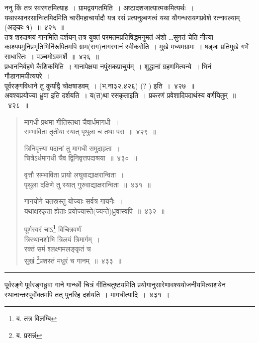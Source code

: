 \documentclass[11pt, openany]{book}
\begin{document}
ननु किं तत्र स्वरगतमित्याह~। {\qtt ग्रामद्वयगतमिति}~। अष्टादशजात्यात्मकमित्यर्थः~। यथास्थानरसान्वितमिदमिति चारीमहाचार्यादौ यत्र रसं प्रत्यनुल्बणत्वं यथा यौगन्धरायणप्रवेशे रत्नावल्याम् (अङ्कः १)~॥~४२५~॥\\

तत्र शरदाश्रयं गानमिति दर्शयन् तत्र युक्तं परमतमप्रतिषिद्धमनुमतं अंशो \ldots सुगतं चेति नीत्या काश्यपमुनिप्रभृतिभिर्निरूपितमपि ग्राम(राग)नागरगानं स्वीकरोति~। मुखे मध्यमग्रामः~। षड्जः {\qtt प्रतिमुखे} गर्भे साधारितः~। पञ्चमोऽवमर्शे~॥~४२६~॥\\

{\qtt प्रधाननिर्वहणे कैशिक}मिति~। {\qtt गानापेक्षया नपुंसकप्राचुर्यम्}~। शुद्धानां ग्रहणमित्यन्ये~। भिनं {\qtt गौडानामपीत्यपरे}~।\\

पूर्वरङ्गविधाने तु {\qtt कुर्याद्वै चोक्षषाडवम्}~। (भ.ना३२.४२६) (? ) इति~।~४२७~॥\\

{\qtt अवश्यप्रयोज्या} ध्रुवा इति दर्शयति~। य(त)था रसकृताइति~। प्रकरणं प्रवेशादिपदार्थस्य वर्णयितुम्~॥~४२८~॥

\newpage

\begin{quote}
{\na मागधी प्रथमा गीतिस्तथा चैवार्धमागधी~।\\
 सम्भाविता तृतीया स्यात् पृथुला च तथा परा~॥~४२९~॥

 त्रिनिवृत्त्या पदानां तु मागधी समुदाहृता~।\\
 चित्रेऽर्धमागधी चैव द्विनिवृत्तपदाश्रया~॥~४३०~॥

 वृत्तौ सम्भाविता प्रायो लघुवाद्याक्षरान्विता~।\\
 पृथुला दक्षिणे तु स्यात् गुरुवाद्याक्षरान्विता~॥~४३१~॥

 गानयोगे चतस्रस्तु योज्याः सर्वत्र गायनैः~।\\
 यथाक्षरकृता ह्येताः प्रयोज्यास्ते(ज्यन्ते)ध्रुवास्वपि~॥~४३२~॥

 पूर्णस्वरं चाऽ\renewcommand{\thefootnote}{1}\footnote{ब. तत्र विलम्बि} विचित्रवर्णं\\
 त्रिस्थानशोभि त्रिलयं त्रिमार्गम्~।\\
 रक्तं समं श्लक्ष्णमलङ्कृतं च\\
 सुखं \renewcommand{\thefootnote}{2}\footnote{ब. प्रसन्नं}प्रशस्तं मधुरं च गानम्~॥~४३३~॥}
\end{quote}

\hrule

\vspace{2mm}
पूर्वरङ्गे पूर्वरङ्गध्रुवा गाने गान्धर्वे चित्रं गीतिचतुष्टयमिति प्रयोगानुसारेणावश्ययोजनीयमित्याशयेन स्थानान्तरपूर्वोक्तमपि तत् पुनरिह दर्शयति~। {\qtt मागधी}त्यादि~।~४३१~।\\
\end{document}
